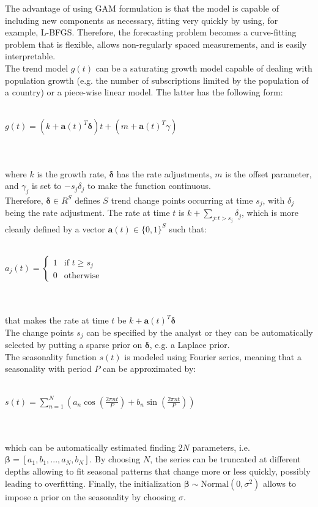 \documentclass[a4paper]{article} %
\begin{document}
	The advantage of using GAM formulation is that the model is capable of including new components as necessary, fitting very quickly by using, for example, L-BFGS. Therefore, the forecasting problem becomes a curve-fitting problem that is flexible, allows non-regularly spaced measurements, and is easily interpretable.\\
	The trend model $g(t)$ can be a saturating growth model capable of dealing with population growth (e.g. the number of subscriptions limited by the population of a country) or a piece-wise linear model.
	The latter has the following form:\\\\
	\centerline{$g(t) = (k+\pmb{a}(t)^T\pmb{\delta})t + (m + \pmb{a}(t)^T\gamma)$}\\\\
	where $k$ is the growth rate, $\pmb{\delta}$ has the rate adjustments, $m$ is the offset parameter, and $\gamma_j$ is set to $-s_j\delta_j$ to make the function continuous.\\
	Therefore, $\pmb{\delta} \in \!R^S$ defines $S$ trend change points occurring at time $s_j$, with $\delta_j$ being the rate adjustment. The rate at time $t$ is $k+\sum_{j:t>s_j}\delta_j$, which is more cleanly defined by a vector $\pmb{a}(t) \in \{0,1\}^S$ such that:\\\\
	\centerline{
		$
		a_j(t) =
		\begin{cases}
			1 & \text{if $t \geq s_j$}\\
			0 & \text{otherwise}
		\end{cases}       
		$
	}\\\\
	that makes the rate at time $t$ be $k + \pmb{a}(t)^T\pmb{\delta}$\\
	The change points $s_j$  can be specified by the analyst or they can be automatically selected by putting a sparse prior on $\pmb{\delta}$, e.g. a Laplace prior.\\
	The seasonality function $s(t)$ is modeled using Fourier series, meaning that a seasonality with period $P$ can be approximated by:\\\\
	\centerline{$s(t) = \sum_{n=1}^{N} (a_n \cos{(\frac{2\pi nt}{P})} + b_n \sin{(\frac{2\pi nt}{P})}) $}\\\\
	which can be automatically estimated finding $2N$ parameters, i.e. $\pmb{\beta} =  [a_1, b_1, ..., a_N, b_N]$. By choosing $N$, the series can be truncated at different depths allowing to fit seasonal patterns that change more or less quickly, possibly leading to overfitting. Finally, the initialization $\pmb{\beta} \sim \text{Normal}(0, \sigma^2)$ allows to impose a prior on the seasonality by choosing $\sigma$. \\
\end{document}
